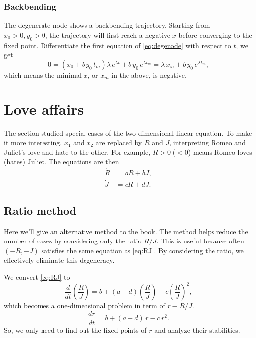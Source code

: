 \documentclass{book}
\begin{document}
\subsubsection{Backbending}

The degenerate node shows a backbending trajectory.  Starting from $x_0 > 0, y_0 > 0$, the trajectory will first reach a negative $x$ before converging to the fixed point.
Differentiate the first equation of \eqref{eq:degenode} with respect to $t$, we get
$$
0 = (x_0 + b \, y_0 \, t_m) \lambda \, e^{\lambda t} + b \, y_0 \, e^{\lambda t_m}
= \lambda \, x_m + b \, y_0 \, e^{\lambda t_m},
$$
which means the minimal $x$, or $x_m$ in the above, is negative.


\section{Love affairs}

The section studied special cases of the two-dimensional linear equation.
To make it more interesting, $x_1$ and $x_2$ are replaced by $R$ and $J$,
interpreting Romeo and Juliet's love and hate to the other.
For example, $R > 0$ ($< 0$) means Romeo loves (hates) Juliet.
The equations are then
\begin{equation}
\begin{aligned}
  \dot R &= a R + b J, \\
  \dot J &= c R + d J.
\end{aligned}
\label{eq:RJ}
\end{equation}



\subsection{Ratio method}

Here we'll give an alternative method to the book.
The method helps reduce the number of cases by considering only the ratio $R/J$.
This is useful because often $(-R, -J)$ satisfies the same equation
as \eqref{eq:RJ}.
By considering the ratio, we effectively eliminate this degeneracy.


We convert \eqref{eq:RJ} to
\begin{equation}
  \frac{d}{dt} \left( \frac R J \right)
  =
  b + (a - d) \left( \frac R J \right) - c \left( \frac R J  \right)^2,
  \label{eq:RoverJ}
\end{equation}
which becomes a one-dimensional problem in term of $r \equiv R/J$.
\begin{equation}
  \frac{dr}{dt}
  =
  b + (a - d) \, r - c \, r^2.
  \label{eq:diffeq_r}
\end{equation}
So, we only need to find out the fixed points of $r$
and analyze their stabilities.
\end{document}
